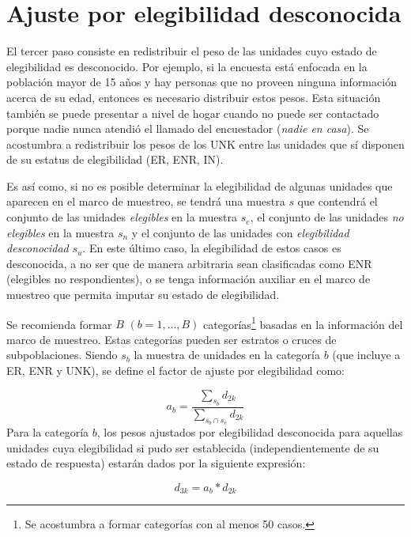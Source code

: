 \documentclass[
  10pt,
  spanish,
]{book}
\begin{document}
\hypertarget{ajuste-por-elegibilidad-desconocida}{%
\section{Ajuste por elegibilidad desconocida}\label{ajuste-por-elegibilidad-desconocida}}

El tercer paso consiste en redistribuir el peso de las unidades cuyo estado de elegibilidad es desconocido. Por ejemplo, si la encuesta está enfocada en la población mayor de 15 años y hay personas que no proveen ninguna información acerca de su edad, entonces es necesario distribuir estos pesos. Esta situación también se puede presentar a nivel de hogar cuando no puede ser contactado porque nadie nunca atendió el llamado del encuestador (\emph{nadie en casa}). Se acostumbra a redistribuir los pesos de los UNK entre las unidades que sí disponen de su estatus de elegibilidad (ER, ENR, IN).

Es así como, si no es posible determinar la elegibilidad de algunas unidades que aparecen en el marco de muestreo, se tendrá una muestra \(s\) que contendrá el conjunto de las unidades \emph{elegibles} en la muestra \(s_{e}\), el conjunto de las unidades \emph{no elegibles} en la muestra \(s_{n}\) y el conjunto de las unidades con \emph{elegibilidad desconocidad} \(s_{u}\). En este último caso, la elegibilidad de estos casos es desconocida, a no ser que de manera arbitraria sean clasificadas como ENR (elegibles no respondientes), o se tenga información auxiliar en el marco de muestreo que permita imputar su estado de elegibilidad.

Se recomienda formar \(B\) \((b = 1, \ldots, B)\) categorías\footnote{Se acostumbra a formar categorías con al menos 50 casos.} basadas en la información del marco de muestreo. Estas categorías pueden ser estratos o cruces de subpoblaciones. Siendo \(s_b\) la muestra de unidades en la categoría \(b\) (que incluye a ER, ENR y UNK), se define el factor de ajuste por elegibilidad como:

\[
a_b = \frac{\sum_{s_b}d_{2k}}{\sum_{s_b \cap s_e}d_{2k}}
\]
Para la categoría \(b\), los pesos ajustados por elegibilidad desconocida para aquellas unidades cuya elegibilidad si pudo ser establecida (independientemente de su estado de respuesta) estarán dados por la siguiente expresión:

\[
d_{3k} = a_b * d_{2k}
\]
\end{document}
